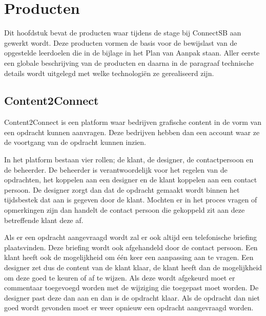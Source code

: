 \section{Producten}
Dit hoofdstuk bevat de producten waar tijdens de stage bij ConnectSB aan gewerkt wordt. Deze producten vormen de basis voor de bewijslast van de opgestelde leerdoelen die in de bijlage in het Plan van Aanpak staan. Aller eerste een globale beschrijving van de producten en daarna in de paragraaf technische details wordt uitgelegd met welke technologiën ze gerealiseerd zijn.

\subsection{Content2Connect}
Content2Connect is een platform waar bedrijven grafische content in de vorm van een opdracht kunnen aanvragen. Deze bedrijven hebben dan een account waar ze de voortgang van de opdracht kunnen inzien.

In het platform bestaan vier rollen; de klant, de designer, de contactpersoon en de beheerder. De beheerder is verantwoordelijk voor het regelen van de opdrachten, het koppelen aan een designer en de klant koppelen aan een contact persoon. De designer zorgt dan dat de opdracht gemaakt wordt binnen het tijdsbestek dat aan is gegeven door de klant. Mochten er in het proces vragen of opmerkingen zijn dan handelt de contact persoon die gekoppeld zit aan deze betreffende klant deze af.

Als er een opdracht aangevraagd wordt zal er ook altijd een telefonische briefing plaatsvinden. Deze briefing wordt ook afgehandeld door de contact persoon. Een klant heeft ook de mogelijkheid om één keer een aanpassing aan te vragen. Een designer zet dus de content van de klant klaar, de klant heeft dan de mogelijkheid om deze goed te keuren of af te wijzen. Als deze wordt afgekeurd moet er commentaar toegevoegd worden met de wijziging die toegepast moet worden. De designer past deze dan aan en dan is de opdracht klaar. Als de opdracht dan niet goed wordt gevonden moet er weer opnieuw een opdracht aangevraagd worden.

